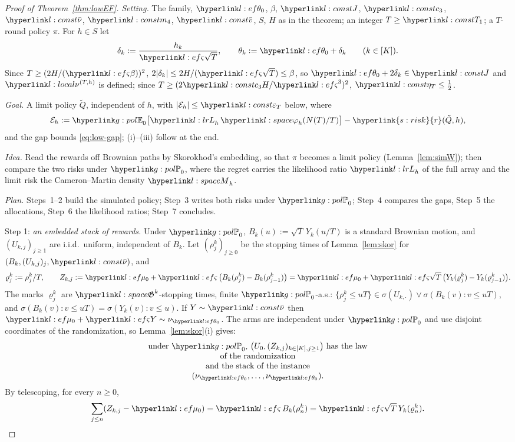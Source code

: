\documentclass[11pt]{article}
\DeclareRobustCommand{\sy}[2]{{\hyperlink{#1}{#2}}}
\newcommand{\1}{\mathbf{1}}
\newcommand{\rk}{\sy{s:risk}{r}}
\begin{document}
\begin{proof}[Proof of Theorem~\ref{thm:lowEF}]
\textit{Setting.} The family, $\lthz$, $\beta$, $\lJ$, $\lcth$, $\lnub$, $\lmq$, $\lvb$, $S$, $H$ as in the theorem; an integer $T\ge\lTone$; a $T$-round policy $\pi$. For $h\in S$ let
\[
\delta_k:=\frac{h_k}{\lsd\sqrt T},\qquad \theta_k:=\lthz+\delta_k\qquad(k\in[K]).
\]
Since $T\ge(2H/(\lsd\beta))^2$, $2|\delta_k|\le2H/(\lsd\sqrt T)\le\beta$, so $\lthz+2\delta_k\in\lJ$ and $\lnuT$ is defined; since $T\ge(2\lcth H/\lsd^3)^2$, $\letT\le\frac12$.

\textit{Goal.} A limit policy $\tilde Q$, independent of $h$, with $|\mathcal E_h|\le\lepT$ below, where
\[
\mathcal E_h:=\gEh_0\big[\lL_h\,\lphi_h(N(T)/T)\big]-\rk(\tilde Q,h),
\]
and the gap bounds \eqref{eq:low-gap}; (i)--(iii) follow at the end.

\textit{Idea.} Read the rewards off Brownian paths by Skorokhod's embedding, so that $\pi$ becomes a limit policy (Lemma~\ref{lem:simW}); then compare the two risks under
$\gPh_0$, where the regret carries the likelihood ratio $\lL_h$ of the full array and the limit risk the Cameron--Martin density $\lM_h$.

\textit{Plan.} Steps~1--2 build the simulated policy; Step~3 writes both risks under $\gPh_0$; Step~4 compares the gaps, Step~5 the allocations, Step~6 the likelihood ratios;
Step~7 concludes.

Step 1: \emph{an embedded stack of rewards.} Under $\gPh_0$, $B_k(u):=\sqrt T\,Y_k(u/T)$ is a standard Brownian motion, and $(U_{k,j})_{j\ge1}$ are i.i.d.\ uniform, independent of
$B_k$. Let $(\rho^k_j)_{j\ge0}$ be the stopping times of Lemma~\ref{lem:skor} for $(B_k,(U_{k,j})_j,\lnub)$, and
\[
\varrho^k_j:=\rho^k_j/T,\qquad Z_{k,j}:=\lmuz+\lsd\,\big(B_k(\rho^k_j)-B_k(\rho^k_{j-1})\big)=\lmuz+\lsd\sqrt T\,\big(Y_k(\varrho^k_j)-Y_k(\varrho^k_{j-1})\big).
\]
The marks $\varrho^k_j$ are $\lG^k$-stopping times, finite $\gPh_0$-a.s.: $\{\rho^k_j\le uT\}\in\sigma(U_{k,\cdot})\vee\sigma(B_k(v):v\le uT)$, and
$\sigma(B_k(v):v\le uT)=\sigma(Y_k(v):v\le u)$. If $Y\sim\lnub$ then $\lmuz+\lsd Y\sim\nu_{\lthz}$. The arms are independent under $\gPh_0$ and use disjoint coordinates of the
randomization, so Lemma~\ref{lem:skor}(i) gives:
\begin{equation}\label{eq:low-law}
\begin{minipage}{0.8\linewidth}\centering
under $\gPh_0$, $\big(U_0,(Z_{k,j})_{k\in[K],j\ge1}\big)$ has the law of the randomization\\ and the stack of the instance $(\nu_{\lthz},\dots,\nu_{\lthz})$.
\end{minipage}
\end{equation}
By telescoping, for every $n\ge0$,
\begin{equation}\label{eq:low-sum}
\sum_{j\le n}(Z_{k,j}-\lmuz)=\lsd\,B_k(\rho^k_n)=\lsd\sqrt T\,Y_k(\varrho^k_n).
\end{equation}


\end{proof}
\end{document}
